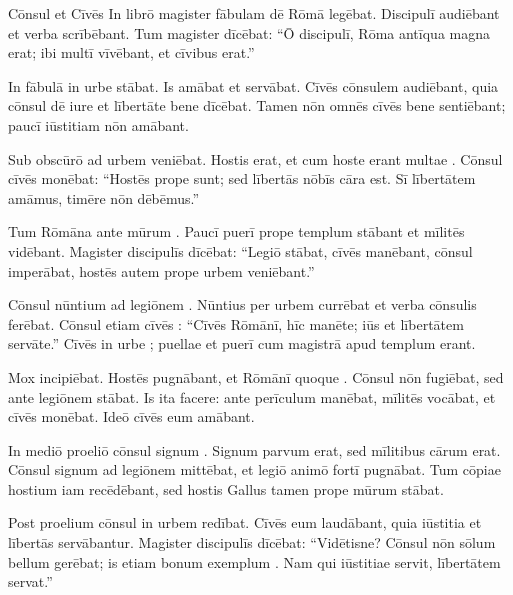 \documentclass[12pt]{nextbook}
\begin{document}
\begin{readersection}{Cōnsul et Cīvēs}
In librō  magister fābulam dē Rōmā legēbat. Discipulī audiēbant et verba scrībēbant. Tum magister dīcēbat: “Ō discipulī, Rōma antīqua magna erat; ibi  multī vīvēbant, et  cīvibus  erat.”

In fābulā  in urbe stābat. Is  amābat et  servābat. Cīvēs cōnsulem audiēbant, quia cōnsul dē iure et lībertāte bene dīcēbat. Tamen nōn omnēs cīvēs bene sentiēbant; paucī iūstitiam nōn amābant.

Sub  obscūrō  ad urbem veniēbat. Hostis  erat, et cum hoste erant multae . Cōnsul cīvēs monēbat: “Hostēs prope sunt; sed lībertās nōbīs cāra est. Sī lībertātem amāmus, timēre nōn dēbēmus.”

Tum  Rōmāna ante mūrum . Paucī puerī prope templum stābant et mīlitēs vidēbant. Magister discipulīs dīcēbat: “Legiō stābat, cīvēs manēbant, cōnsul imperābat, hostēs autem prope urbem veniēbant.”

Cōnsul nūntium ad legiōnem . Nūntius per urbem currēbat et verba cōnsulis ferēbat. Cōnsul etiam cīvēs : “Cīvēs Rōmānī, hīc manēte; iūs et lībertātem servāte.” Cīvēs in urbe ; puellae et puerī cum magistrā apud templum erant.

Mox  incipiēbat. Hostēs pugnābant, et Rōmānī quoque . Cōnsul nōn fugiēbat, sed ante legiōnem stābat. Is  ita facere: ante perīculum manēbat, mīlitēs vocābat, et cīvēs monēbat. Ideō cīvēs eum amābant.

In mediō proeliō cōnsul signum . Signum parvum erat, sed mīlitibus cārum erat. Cōnsul signum ad legiōnem mittēbat, et legiō animō fortī pugnābat. Tum cōpiae hostium iam recēdēbant, sed hostis Gallus tamen prope mūrum stābat.

Post proelium cōnsul in urbem redībat. Cīvēs eum laudābant, quia iūstitia et lībertās servābantur. Magister discipulīs dīcēbat: “Vidētisne? Cōnsul nōn sōlum bellum gerēbat; is etiam bonum exemplum . Nam qui iūstitiae servit, lībertātem servat.”


\end{readersection}
\end{document}
